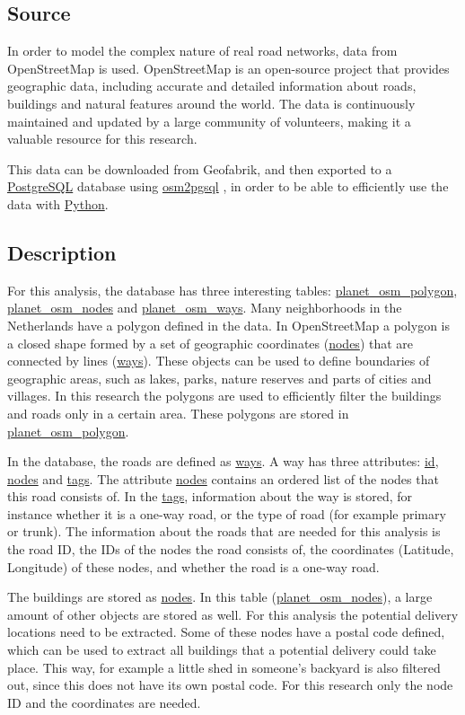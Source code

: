 \subsection{Source}
In order to model the complex nature of real road networks, data from OpenStreetMap \citep{openstreetmap} is used.
OpenStreetMap is an open-source project that provides geographic data, including accurate and detailed information about roads, buildings and natural features around the world.
The data is continuously maintained and updated by a large community of volunteers, making it a valuable resource for this research.

This data can be downloaded from Geofabrik, and then exported to a \url{PostgreSQL} \citep{postgresql}
database using \url{osm2pgsql} \citep{osm2pgsql}, in order to be able to efficiently use the data with \url{Python}.

\subsection{Description}
For this analysis, the database has three interesting tables: \url{planet_osm_polygon},\\ \url{planet_osm_nodes} and \url{planet_osm_ways}.
Many neighborhoods in the Netherlands have a polygon defined in the data.
In OpenStreetMap a polygon is a closed shape formed by a set of geographic coordinates (\url{nodes}) that are connected by lines (\url{ways}).
These objects can be used to define boundaries of geographic areas, such as lakes, parks, nature reserves and parts of cities and villages.
In this research the polygons are used to efficiently filter the buildings and roads only in a certain area.
These polygons are stored in \url{planet_osm_polygon}.

In the database, the roads are defined as \url{ways}.
A way has three attributes: \url{id}, \url{nodes} and \url{tags}.
The attribute \url{nodes} contains an ordered list of the nodes that this road consists of.
In the \url{tags}, information about the way is stored, for instance whether it is a one-way road, or the type of road (for example primary or trunk).
The information about the roads that are needed for this analysis is the road ID, the IDs of the nodes the road consists of, the coordinates (Latitude, Longitude) of these nodes, and whether the road is a one-way road.

The buildings are stored as \url{nodes}. In this table (\url{planet_osm_nodes}), a large amount of other objects are stored as well.
For this analysis the potential delivery locations need to be extracted.
Some of these nodes have a postal code defined, which can be used to extract all buildings that a potential delivery could take place.
This way, for example a little shed in someone's backyard is also filtered out, since this does not have its own postal code.
For this research only the node ID and the coordinates are needed.

